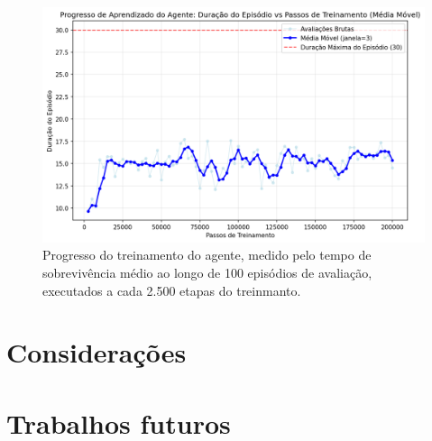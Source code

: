 \documentclass[conference]{IEEEtran}
\begin{document}
\begin{figure}[htpb]
    \centering
    \includegraphics[width=1\linewidth]{figures/eval_progress.png}
    \caption{Progresso do treinamento do agente, medido pelo tempo de sobrevivência médio ao longo de 100 episódios de avaliação, executados a cada 2.500 etapas do treinmanto.}
    \label{fig:ep_lens_control}
\end{figure}

\section{Considerações}

\section{Trabalhos futuros}

\newpage


\end{document}
